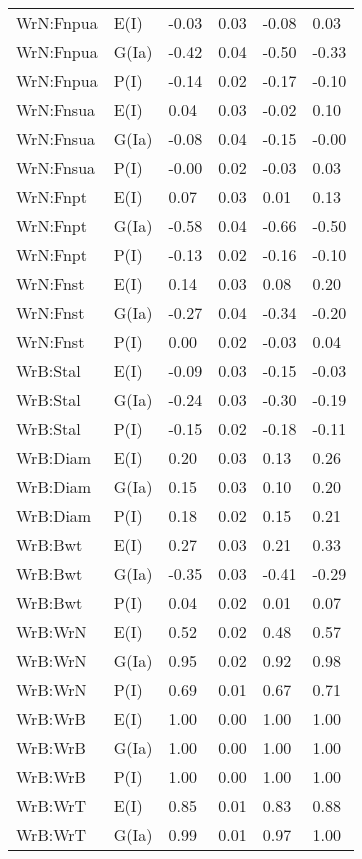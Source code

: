 \begin{center}
\begin{longtable}{|p{1.1in}|p{0.7in}|p{0.7in}|p{0.6in}|p{0.6in}|p{0.6in}|}
  WrN:Fnpua & E(I) & -0.03 & 0.03 & -0.08 & 0.03 \\ 
  WrN:Fnpua & G(Ia) & -0.42 & 0.04 & -0.50 & -0.33 \\ 
  WrN:Fnpua & P(I) & -0.14 & 0.02 & -0.17 & -0.10 \\ 
  WrN:Fnsua & E(I) & 0.04 & 0.03 & -0.02 & 0.10 \\ 
  WrN:Fnsua & G(Ia) & -0.08 & 0.04 & -0.15 & -0.00 \\ 
  WrN:Fnsua & P(I) & -0.00 & 0.02 & -0.03 & 0.03 \\ 
  WrN:Fnpt & E(I) & 0.07 & 0.03 & 0.01 & 0.13 \\ 
  WrN:Fnpt & G(Ia) & -0.58 & 0.04 & -0.66 & -0.50 \\ 
  WrN:Fnpt & P(I) & -0.13 & 0.02 & -0.16 & -0.10 \\ 
  WrN:Fnst & E(I) & 0.14 & 0.03 & 0.08 & 0.20 \\ 
  WrN:Fnst & G(Ia) & -0.27 & 0.04 & -0.34 & -0.20 \\ 
  WrN:Fnst & P(I) & 0.00 & 0.02 & -0.03 & 0.04 \\ 
  WrB:Stal & E(I) & -0.09 & 0.03 & -0.15 & -0.03 \\ 
  WrB:Stal & G(Ia) & -0.24 & 0.03 & -0.30 & -0.19 \\ 
  WrB:Stal & P(I) & -0.15 & 0.02 & -0.18 & -0.11 \\ 
  WrB:Diam & E(I) & 0.20 & 0.03 & 0.13 & 0.26 \\ 
  WrB:Diam & G(Ia) & 0.15 & 0.03 & 0.10 & 0.20 \\ 
  WrB:Diam & P(I) & 0.18 & 0.02 & 0.15 & 0.21 \\ 
  WrB:Bwt & E(I) & 0.27 & 0.03 & 0.21 & 0.33 \\ 
  WrB:Bwt & G(Ia) & -0.35 & 0.03 & -0.41 & -0.29 \\ 
  WrB:Bwt & P(I) & 0.04 & 0.02 & 0.01 & 0.07 \\ 
  WrB:WrN & E(I) & 0.52 & 0.02 & 0.48 & 0.57 \\ 
  WrB:WrN & G(Ia) & 0.95 & 0.02 & 0.92 & 0.98 \\ 
  WrB:WrN & P(I) & 0.69 & 0.01 & 0.67 & 0.71 \\ 
  WrB:WrB & E(I) & 1.00 & 0.00 & 1.00 & 1.00 \\ 
  WrB:WrB & G(Ia) & 1.00 & 0.00 & 1.00 & 1.00 \\ 
  WrB:WrB & P(I) & 1.00 & 0.00 & 1.00 & 1.00 \\ 
  WrB:WrT & E(I) & 0.85 & 0.01 & 0.83 & 0.88 \\ 
  WrB:WrT & G(Ia) & 0.99 & 0.01 & 0.97 & 1.00 \\ 

\end{longtable}
\end{center}
